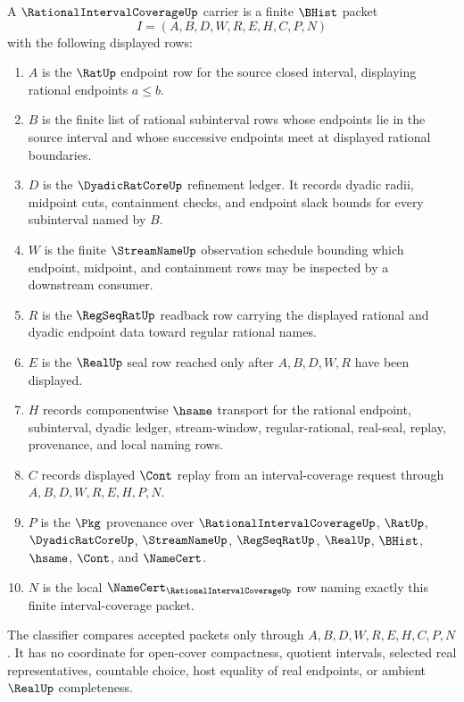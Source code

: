 \begin{definition}
\label{def:rational-interval-coverage-carrier}
A $\RationalIntervalCoverageUp$ carrier is a finite $\BHist$ packet
$$
I=(A,B,D,W,R,E,H,C,P,N)
$$
with the following displayed rows:
\begin{enumerate}
\item $A$ is the $\RatUp$ endpoint row for the source closed interval, displaying rational endpoints $a \leq b$.
\item $B$ is the finite list of rational subinterval rows whose endpoints lie in the source interval and whose successive endpoints meet at displayed rational boundaries.
\item $D$ is the $\DyadicRatCoreUp$ refinement ledger. It records dyadic radii, midpoint cuts, containment checks, and endpoint slack bounds for every subinterval named by $B$.
\item $W$ is the finite $\StreamNameUp$ observation schedule bounding which endpoint, midpoint, and containment rows may be inspected by a downstream consumer.
\item $R$ is the $\RegSeqRatUp$ readback row carrying the displayed rational and dyadic endpoint data toward regular rational names.
\item $E$ is the $\RealUp$ seal row reached only after $A,B,D,W,R$ have been displayed.
\item $H$ records componentwise $\hsame$ transport for the rational endpoint, subinterval, dyadic ledger, stream-window, regular-rational, real-seal, replay, provenance, and local naming rows.
\item $C$ records displayed $\Cont$ replay from an interval-coverage request through $A,B,D,W,R,E,H,P,N$.
\item $P$ is the $\Pkg$ provenance over $\RationalIntervalCoverageUp$, $\RatUp$, $\DyadicRatCoreUp$, $\StreamNameUp$, $\RegSeqRatUp$, $\RealUp$, $\BHist$, $\hsame$, $\Cont$, and $\NameCert$.
\item $N$ is the local $\NameCert_{\RationalIntervalCoverageUp}$ row naming exactly this finite interval-coverage packet.
\end{enumerate}
The classifier compares accepted packets only through $A,B,D,W,R,E,H,C,P,N$. It has no coordinate for open-cover compactness, quotient intervals, selected real representatives, countable choice, host equality of real endpoints, or ambient $\RealUp$ completeness.
\end{definition}

